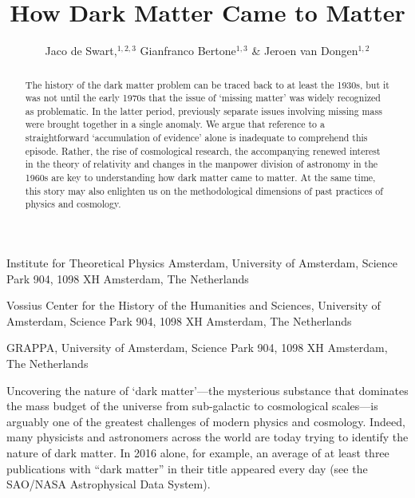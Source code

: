 \documentclass{naturefig}
\title{How Dark Matter Came to Matter
}
\author{Jaco de Swart,$^{1,2,3}$ Gianfranco Bertone$^{1,3}$ \& Jeroen van Dongen$^{1,2}$}
\begin{document}
\maketitle
\vspace{18pt}
\begin{affiliations}
 \item Institute for Theoretical Physics Amsterdam, University of Amsterdam, Science Park 904, 1098 XH Amsterdam, The Netherlands
 \item Vossius Center for the History of the Humanities and Sciences, University of Amsterdam, Science Park 904, 1098 XH Amsterdam, The Netherlands
 \item GRAPPA, University of Amsterdam, Science Park 904, 1098 XH Amsterdam, The Netherlands
\end{affiliations}


\begin{abstract}
The history of the dark matter problem can be traced back to at least the 1930s, but it was not until the early 1970s that the issue of `missing matter' was widely recognized as problematic. In the latter period, previously separate issues involving missing mass were brought together in a single anomaly. We argue that reference to a straightforward `accumulation of evidence' alone is inadequate to comprehend this episode.
Rather, the rise of cosmological research, the accompanying renewed interest in the theory of relativity and changes in the manpower division of astronomy in the 1960s are key to understanding how dark matter came to matter. At the same time, this story may also enlighten us on the methodological dimensions of past practices of physics and cosmology.
\end{abstract}

\vspace{3ex}

\noindent
Uncovering the nature of `dark matter'---the mysterious substance that dominates the mass budget of the universe from sub-galactic to cosmological scales---is arguably one of the greatest challenges of modern physics and cosmology. Indeed, many physicists and astronomers across the world are today trying to identify the nature of dark matter.\cite{Bertone2010} In 2016 alone, for example, an average of at least three publications with ``dark matter'' in their title appeared every day (see the SAO/NASA Astrophysical Data System).
\end{document}
